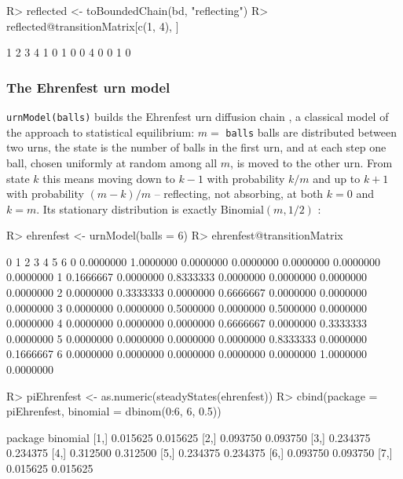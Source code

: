\documentclass[
  nojss]{jss}
\begin{document}
\begin{CodeChunk}
\begin{CodeInput}
R> reflected <- toBoundedChain(bd, "reflecting")
R> reflected@transitionMatrix[c(1, 4), ]
\end{CodeInput}
\begin{CodeOutput}
  1 2 3 4
1 0 1 0 0
4 0 0 1 0
\end{CodeOutput}
\end{CodeChunk}

\subsubsection{The Ehrenfest urn model}\label{the-ehrenfest-urn-model}

\texttt{urnModel(balls)} builds the Ehrenfest urn diffusion chain
\citep{ehrenfest1907}, a classical model of the approach to statistical
equilibrium: \(m=\) \texttt{balls} balls are distributed between two urns, the state
is the number of balls in the first urn, and at each step one ball, chosen
uniformly at random among all \(m\), is moved to the other urn. From state
\(k\) this means moving down to \(k-1\) with probability \(k/m\) and up to \(k+1\)
with probability \((m-k)/m\) -- reflecting, not absorbing, at both \(k=0\) and
\(k=m\). Its stationary distribution is exactly \(\mathrm{Binomial}(m,1/2)\)
\citep{GrinsteadSnell}:

\begin{CodeChunk}
\begin{CodeInput}
R> ehrenfest <- urnModel(balls = 6)
R> ehrenfest@transitionMatrix
\end{CodeInput}
\begin{CodeOutput}
          0         1         2         3         4         5         6
0 0.0000000 1.0000000 0.0000000 0.0000000 0.0000000 0.0000000 0.0000000
1 0.1666667 0.0000000 0.8333333 0.0000000 0.0000000 0.0000000 0.0000000
2 0.0000000 0.3333333 0.0000000 0.6666667 0.0000000 0.0000000 0.0000000
3 0.0000000 0.0000000 0.5000000 0.0000000 0.5000000 0.0000000 0.0000000
4 0.0000000 0.0000000 0.0000000 0.6666667 0.0000000 0.3333333 0.0000000
5 0.0000000 0.0000000 0.0000000 0.0000000 0.8333333 0.0000000 0.1666667
6 0.0000000 0.0000000 0.0000000 0.0000000 0.0000000 1.0000000 0.0000000
\end{CodeOutput}
\begin{CodeInput}
R> piEhrenfest <- as.numeric(steadyStates(ehrenfest))
R> cbind(package = piEhrenfest, binomial = dbinom(0:6, 6, 0.5))
\end{CodeInput}
\begin{CodeOutput}
      package binomial
[1,] 0.015625 0.015625
[2,] 0.093750 0.093750
[3,] 0.234375 0.234375
[4,] 0.312500 0.312500
[5,] 0.234375 0.234375
[6,] 0.093750 0.093750
[7,] 0.015625 0.015625
\end{CodeOutput}
\end{CodeChunk}
\end{document}
